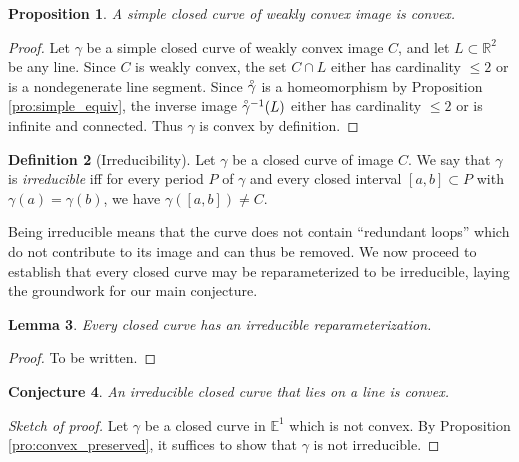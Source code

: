 \documentclass{amsart}
\newtheorem{proposition}{Proposition}[section]
\newtheorem{lemma}[proposition]{Lemma}
\newtheorem{conjecture}[proposition]{Conjecture}
\theoremstyle{definition}
\newtheorem{definition}[proposition]{Definition}
\theoremstyle{remark}
\newcommand{\lring}[1]{\accentset{\circ}{#1}}
\begin{document}
\begin{proposition}
    \label{pro:simple_convex}
    A simple closed curve of weakly convex image is convex.
\end{proposition}

\begin{proof}
    Let $\gamma$ be a simple closed curve of weakly convex image $C$,
    and let $L\subset\mathbb{R}^2$ be any line.
    Since $C$ is weakly convex, the set $C\cap L$
    either has cardinality $\le2$ or is a nondegenerate line segment.
    Since $\lring{\gamma}$ is a homeomorphism by Proposition
    \ref{pro:simple_equiv}, the inverse image $\lring{\gamma}^{-1}(L)$
    either has cardinality $\le2$ or is infinite and connected.
    Thus $\gamma$ is convex by definition.
\end{proof}

\begin{definition}[Irreducibility]
    Let $\gamma$ be a closed curve of image $C$.
    We say that $\gamma$ is \emph{irreducible} iff for every period
    $P$ of $\gamma$ and every closed interval $[a,b]\subset P$
    with $\gamma(a)=\gamma(b)$, we have
    $\gamma([a,b])\ne C$.
\end{definition}

Being irreducible means that the curve does not contain
``redundant loops'' which do not contribute to its image
and can thus be removed. We now proceed to establish
that every closed curve may be reparameterized to be
irreducible, laying the groundwork for our main conjecture.

\begin{lemma}
    \label{lem:irr_exists}
    Every closed curve has an irreducible reparameterization.
\end{lemma}

\begin{proof}
    To be written.
\end{proof}

\begin{conjecture}
    \label{con:irr_linear_convex}
    An irreducible closed curve that lies on a line is convex.
\end{conjecture}

\begin{proof}[Sketch of proof]
    Let $\gamma$ be a closed curve in $\mathbb{E}^1$ which is
    not convex. By Proposition \ref{pro:convex_preserved},
    it suffices to show that $\gamma$ is not irreducible.
\end{proof}
\end{document}
